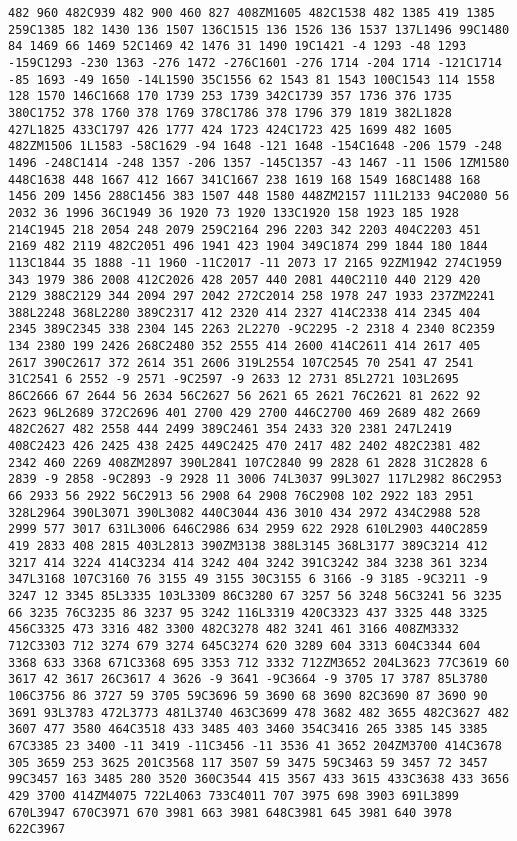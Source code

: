 \documentclass[
]{article}
\begin{document}
\begin{verbatim}
482 960 482C939 482 900 460 827 408ZM1605 482C1538 482 1385 419 1385 259C1385 182 1430 136 1507 136C1515 136 1526 136 1537 137L1496 99C1480 84 1469 66 1469 52C1469 42 1476 31 1490 19C1421 -4 1293 -48 1293 -159C1293 -230 1363 -276 1472 -276C1601 -276 1714 -204 1714 -121C1714 -85 1693 -49 1650 -14L1590 35C1556 62 1543 81 1543 100C1543 114 1558 128 1570 146C1668 170 1739 253 1739 342C1739 357 1736 376 1735 380C1752 378 1760 378 1769 378C1786 378 1796 379 1819 382L1828 427L1825 433C1797 426 1777 424 1723 424C1723 425 1699 482 1605 482ZM1506 1L1583 -58C1629 -94 1648 -121 1648 -154C1648 -206 1579 -248 1496 -248C1414 -248 1357 -206 1357 -145C1357 -43 1467 -11 1506 1ZM1580 448C1638 448 1667 412 1667 341C1667 238 1619 168 1549 168C1488 168 1456 209 1456 288C1456 383 1507 448 1580 448ZM2157 111L2133 94C2080 56 2032 36 1996 36C1949 36 1920 73 1920 133C1920 158 1923 185 1928 214C1945 218 2054 248 2079 259C2164 296 2203 342 2203 404C2203 451 2169 482 2119 482C2051 496 1941 423 1904 349C1874 299 1844 180 1844 113C1844 35 1888 -11 1960 -11C2017 -11 2073 17 2165 92ZM1942 274C1959 343 1979 386 2008 412C2026 428 2057 440 2081 440C2110 440 2129 420 2129 388C2129 344 2094 297 2042 272C2014 258 1978 247 1933 237ZM2241 388L2248 368L2280 389C2317 412 2320 414 2327 414C2338 414 2345 404 2345 389C2345 338 2304 145 2263 2L2270 -9C2295 -2 2318 4 2340 8C2359 134 2380 199 2426 268C2480 352 2555 414 2600 414C2611 414 2617 405 2617 390C2617 372 2614 351 2606 319L2554 107C2545 70 2541 47 2541 31C2541 6 2552 -9 2571 -9C2597 -9 2633 12 2731 85L2721 103L2695 86C2666 67 2644 56 2634 56C2627 56 2621 65 2621 76C2621 81 2622 92 2623 96L2689 372C2696 401 2700 429 2700 446C2700 469 2689 482 2669 482C2627 482 2558 444 2499 389C2461 354 2433 320 2381 247L2419 408C2423 426 2425 438 2425 449C2425 470 2417 482 2402 482C2381 482 2342 460 2269 408ZM2897 390L2841 107C2840 99 2828 61 2828 31C2828 6 2839 -9 2858 -9C2893 -9 2928 11 3006 74L3037 99L3027 117L2982 86C2953 66 2933 56 2922 56C2913 56 2908 64 2908 76C2908 102 2922 183 2951 328L2964 390L3071 390L3082 440C3044 436 3010 434 2972 434C2988 528 2999 577 3017 631L3006 646C2986 634 2959 622 2928 610L2903 440C2859 419 2833 408 2815 403L2813 390ZM3138 388L3145 368L3177 389C3214 412 3217 414 3224 414C3234 414 3242 404 3242 391C3242 384 3238 361 3234 347L3168 107C3160 76 3155 49 3155 30C3155 6 3166 -9 3185 -9C3211 -9 3247 12 3345 85L3335 103L3309 86C3280 67 3257 56 3248 56C3241 56 3235 66 3235 76C3235 86 3237 95 3242 116L3319 420C3323 437 3325 448 3325 456C3325 473 3316 482 3300 482C3278 482 3241 461 3166 408ZM3332 712C3303 712 3274 679 3274 645C3274 620 3289 604 3313 604C3344 604 3368 633 3368 671C3368 695 3353 712 3332 712ZM3652 204L3623 77C3619 60 3617 42 3617 26C3617 4 3626 -9 3641 -9C3664 -9 3705 17 3787 85L3780 106C3756 86 3727 59 3705 59C3696 59 3690 68 3690 82C3690 87 3690 90 3691 93L3783 472L3773 481L3740 463C3699 478 3682 482 3655 482C3627 482 3607 477 3580 464C3518 433 3485 403 3460 354C3416 265 3385 145 3385 67C3385 23 3400 -11 3419 -11C3456 -11 3536 41 3652 204ZM3700 414C3678 305 3659 253 3625 201C3568 117 3507 59 3475 59C3463 59 3457 72 3457 99C3457 163 3485 280 3520 360C3544 415 3567 433 3615 433C3638 433 3656 429 3700 414ZM4075 722L4063 733C4011 707 3975 698 3903 691L3899 670L3947 670C3971 670 3981 663 3981 648C3981 645 3981 640 3978 622C3967 
\end{verbatim}
\end{document}
